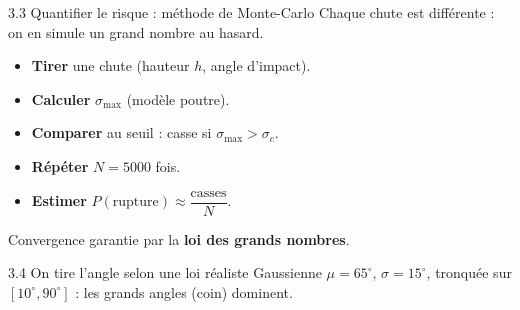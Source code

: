 \documentclass[11pt,aspectratio=169]{beamer}
\begin{document}
\begin{frame}{3.3 Quantifier le risque : méthode de Monte-Carlo}
  \footnotesize
  Chaque chute est différente : on en simule un grand nombre au hasard.
  \begin{itemize}[itemsep=3pt]
    \item[\textcolor{verre}{\textbf{1.}}] \textbf{Tirer} une chute (hauteur $h$, angle d'impact).
    \item[\textcolor{verre}{\textbf{2.}}] \textbf{Calculer} $\sigma_{\max}$ (modèle poutre).
    \item[\textcolor{verre}{\textbf{3.}}] \textbf{Comparer} au seuil : casse si $\sigma_{\max}>\sigma_c$.
    \item[\textcolor{verre}{\textbf{4.}}] \textbf{Répéter} $N=5000$ fois.
    \item[\textcolor{verre}{\textbf{5.}}] \textbf{Estimer} $P(\text{rupture})\approx \dfrac{\text{casses}}{N}$.
  \end{itemize}
  \centering\scriptsize Convergence garantie par la \textbf{loi des grands nombres}.
\end{frame}

\begin{frame}{3.4 On tire l'angle selon une loi réaliste}
  \footnotesize Gaussienne $\mu=65^\circ$, $\sigma=15^\circ$, tronquée sur
  $[10^\circ,90^\circ]$ : les grands angles (coin) dominent.
  \vspace{0.1cm}
  \centering
\end{frame}
\end{document}
